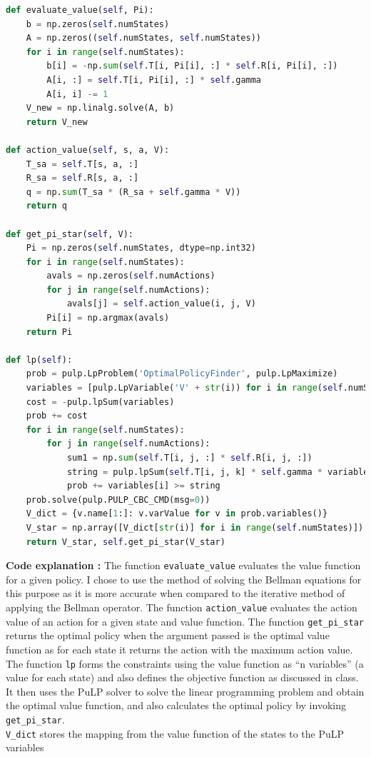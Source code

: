 \documentclass[11pt]{article}
\begin{document}
\begin{lstlisting}[language=Python]      
def evaluate_value(self, Pi):
    b = np.zeros(self.numStates)
    A = np.zeros((self.numStates, self.numStates))
    for i in range(self.numStates):
        b[i] = -np.sum(self.T[i, Pi[i], :] * self.R[i, Pi[i], :])
        A[i, :] = self.T[i, Pi[i], :] * self.gamma
        A[i, i] -= 1
    V_new = np.linalg.solve(A, b)
    return V_new

def action_value(self, s, a, V):
    T_sa = self.T[s, a, :]
    R_sa = self.R[s, a, :]
    q = np.sum(T_sa * (R_sa + self.gamma * V))
    return q

def get_pi_star(self, V):
    Pi = np.zeros(self.numStates, dtype=np.int32)
    for i in range(self.numStates):
        avals = np.zeros(self.numActions)
        for j in range(self.numActions):
            avals[j] = self.action_value(i, j, V)
        Pi[i] = np.argmax(avals)
    return Pi

def lp(self):
    prob = pulp.LpProblem('OptimalPolicyFinder', pulp.LpMaximize)
    variables = [pulp.LpVariable('V' + str(i)) for i in range(self.numStates)]
    cost = -pulp.lpSum(variables)
    prob += cost
    for i in range(self.numStates):
        for j in range(self.numActions):
            sum1 = np.sum(self.T[i, j, :] * self.R[i, j, :])
            string = pulp.lpSum(self.T[i, j, k] * self.gamma * variables[k] for k in range(self.numStates)) + sum1
            prob += variables[i] >= string
    prob.solve(pulp.PULP_CBC_CMD(msg=0))
    V_dict = {v.name[1:]: v.varValue for v in prob.variables()}
    V_star = np.array([V_dict[str(i)] for i in range(self.numStates)])
    return V_star, self.get_pi_star(V_star)
\end{lstlisting}
    \noindent
    \textbf{Code explanation :} The function \texttt{evaluate\_value} evaluates the
    value function for a given policy. I chose to use the method of solving the Bellman
    equations for this purpose as it is more accurate when compared to the iterative method
    of applying the Bellman operator. The function \texttt{action\_value} evaluates the 
    action value of an action for a given state and value function. The function \texttt{get\_pi\_star}
    returns the optimal policy when the argument passed is the optimal value function as for
    each state it returns the action with the maximum action value. The function \texttt{lp}
    forms the constraints using the value function as ``n variables'' (a value for each state) and 
    also defines the objective function as discussed in class. It then uses the PuLP solver to 
    solve the linear programming problem and obtain the optimal value function, and also
    calculates the optimal policy by invoking \texttt{get\_pi\_star}.
    \\ \texttt{V\_dict} stores the mapping from the value function of the states to the 
    PuLP variables
\newpage
\end{document}

